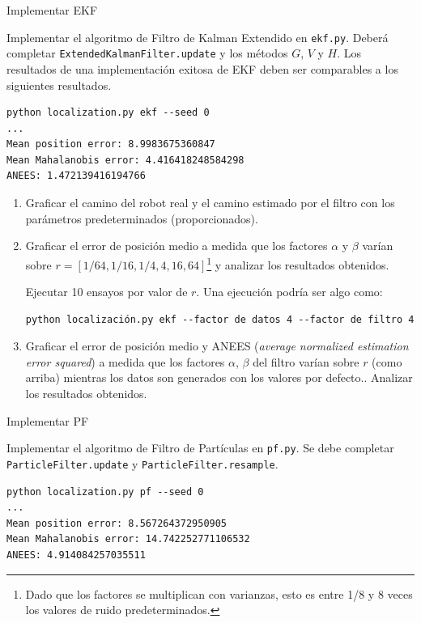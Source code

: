\documentclass[tp]{lcc}
\begin{document}
	\ejercicio Implementar EKF
    
	Implementar el algoritmo de Filtro de Kalman Extendido en \lstinline[style=bash]{ekf.py}. Deberá completar \lstinline[style=bash]{ExtendedKalmanFilter.update} y los métodos $G$, $V$ y $H$. Los resultados de una implementación exitosa de EKF deben ser comparables a los siguientes resultados.

\begin{lstlisting}[style=bash] 
python localization.py ekf --seed 0
...
Mean position error: 8.9983675360847
Mean Mahalanobis error: 4.416418248584298
ANEES: 1.472139416194766
\end{lstlisting}


	\begin{enumerate}
		\item Graficar el camino del robot real y el camino estimado por el filtro con los parámetros predeterminados (proporcionados).
		\item  Graficar el error de posición medio a medida que los factores $\alpha$ y $\beta$ varían sobre $r = [1/64, 1/16, 1/4, 4, 16, 64]$\footnote{Dado que los factores se multiplican con varianzas, esto es entre 1/8 y 8 veces los valores de ruido predeterminados.} y analizar los resultados obtenidos.
		
		Ejecutar 10 ensayos por valor de $r$. Una ejecución podría ser algo como:

\begin{lstlisting}[style=bash] 
python localización.py ekf --factor de datos 4 --factor de filtro 4
\end{lstlisting}

		\item Graficar el error de posición medio y ANEES (\emph{average normalized estimation error squared}) a medida que los factores $\alpha$, $\beta$ del filtro varían sobre $r$ (como arriba) mientras los datos son generados con los valores por defecto.. Analizar los resultados obtenidos.
	\end{enumerate}


	\ejercicio Implementar PF
	
	Implementar el algoritmo de Filtro de Partículas en \lstinline[style=bash]{pf.py}. Se debe completar \lstinline[style=bash]{ParticleFilter.update} y \lstinline[style=bash]{ParticleFilter.resample}.

\begin{lstlisting}[style=bash] 
python localization.py pf --seed 0
...
Mean position error: 8.567264372950905
Mean Mahalanobis error: 14.742252771106532
ANEES: 4.914084257035511
\end{lstlisting}
\end{document}
